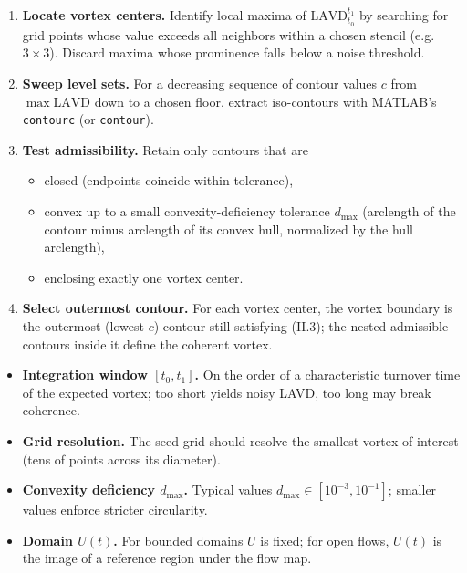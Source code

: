 \documentclass[../main.tex]{subfiles}
\begin{document}
\begin{result}
\begin{enumerate}
    \item[(II.1)] \textbf{Locate vortex centers.} Identify local maxima of $\mathrm{LAVD}_{t_0}^{t_1}$ by searching for grid points whose value exceeds all neighbors within a chosen stencil (e.g.\ $3\times 3$). Discard maxima whose prominence falls below a noise threshold.
    \item[(II.2)] \textbf{Sweep level sets.} For a decreasing sequence of contour values $c$ from $\max\mathrm{LAVD}$ down to a chosen floor, extract iso-contours with MATLAB's \texttt{contourc} (or \texttt{contour}).
    \item[(II.3)] \textbf{Test admissibility.} Retain only contours that are
    \begin{itemize}
        \item closed (endpoints coincide within tolerance),
        \item convex up to a small convexity-deficiency tolerance $d_{\max}$ (arclength of the contour minus arclength of its convex hull, normalized by the hull arclength),
        \item enclosing exactly one vortex center.
    \end{itemize}
    \item[(II.4)] \textbf{Select outermost contour.} For each vortex center, the vortex boundary is the outermost (lowest $c$) contour still satisfying (II.3); the nested admissible contours inside it define the coherent vortex.
\end{enumerate}
\end{result}

\begin{fact}
\begin{itemize}
    \item \textbf{Integration window $[t_0,t_1]$.} On the order of a characteristic turnover time of the expected vortex; too short yields noisy LAVD, too long may break coherence.
    \item \textbf{Grid resolution.} The seed grid should resolve the smallest vortex of interest (tens of points across its diameter).
    \item \textbf{Convexity deficiency $d_{\max}$.} Typical values $d_{\max}\in[10^{-3},10^{-1}]$; smaller values enforce stricter circularity.
    \item \textbf{Domain $U(t)$.} For bounded domains $U$ is fixed; for open flows, $U(t)$ is the image of a reference region under the flow map.
\end{itemize}
\end{fact}
\end{document}
